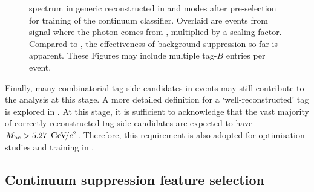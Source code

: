 \begin{figure}[hbtp!]
    \centering
    \caption{\label{fig:preselected_photons} \BtoXsgamma spectrum in generic \MC reconstructed in \feiBp and \feiBz modes
    after pre-selection for training of the continuum \BDT classifier.
    Overlaid are events from signal \MC where the photon comes from \BtoXsgamma, multiplied by a scaling factor.
    Compared to , the effectiveness of background suppression so far is apparent.
    These Figures may include multiple tag-$B$ entries per event.
    }
\end{figure}

Finally, many combinatorial tag-side candidates in \BB events may still contribute to the analysis at this stage.
A more detailed definition for a `well-reconstructed' tag is explored in .
At this stage, it is sufficient to acknowledge that the vast majority of correctly reconstructed tag-side candidates are expected to have \mbox{${M_{\mathrm{bc}}}>5.27~{\mathrm{\,Ge\kern -0.1em V\!/}c^2}$}.
Therefore, this requirement is also adopted for optimisation studies and training in .

\subsection{Continuum suppression feature selection}\label{sec:continuum_features}


